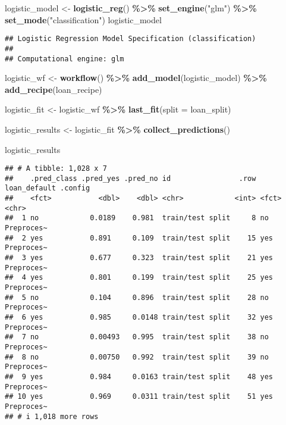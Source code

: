 \documentclass[
]{article}
\newenvironment{Shaded}{\begin{snugshade}}{\end{snugshade}}
\newcommand{\AttributeTok}[1]{\textcolor[rgb]{0.13,0.29,0.53}{#1}}
\newcommand{\FunctionTok}[1]{\textcolor[rgb]{0.13,0.29,0.53}{\textbf{#1}}}
\newcommand{\NormalTok}[1]{#1}
\newcommand{\OtherTok}[1]{\textcolor[rgb]{0.56,0.35,0.01}{#1}}
\newcommand{\SpecialCharTok}[1]{\textcolor[rgb]{0.81,0.36,0.00}{\textbf{#1}}}
\newcommand{\StringTok}[1]{\textcolor[rgb]{0.31,0.60,0.02}{#1}}
\begin{document}
\begin{Shaded}
\begin{Highlighting}[]
\NormalTok{logistic\_model }\OtherTok{\textless{}{-}} \FunctionTok{logistic\_reg}\NormalTok{() }\SpecialCharTok{\%\textgreater{}\%} 
                  \FunctionTok{set\_engine}\NormalTok{(}\StringTok{"glm"}\NormalTok{) }\SpecialCharTok{\%\textgreater{}\%} 
                  \FunctionTok{set\_mode}\NormalTok{(}\StringTok{"classification"}\NormalTok{)}
\NormalTok{logistic\_model}
\end{Highlighting}
\end{Shaded}

\begin{verbatim}
## Logistic Regression Model Specification (classification)
## 
## Computational engine: glm
\end{verbatim}

\begin{Shaded}
\begin{Highlighting}[]
\NormalTok{logistic\_wf }\OtherTok{\textless{}{-}} \FunctionTok{workflow}\NormalTok{() }\SpecialCharTok{\%\textgreater{}\%} 
               \FunctionTok{add\_model}\NormalTok{(logistic\_model) }\SpecialCharTok{\%\textgreater{}\%} 
               \FunctionTok{add\_recipe}\NormalTok{(loan\_recipe)}

\NormalTok{logistic\_fit }\OtherTok{\textless{}{-}}\NormalTok{   logistic\_wf }\SpecialCharTok{\%\textgreater{}\%} 
                \FunctionTok{last\_fit}\NormalTok{(}\AttributeTok{split =}\NormalTok{ loan\_split)}

\NormalTok{logistic\_results }\OtherTok{\textless{}{-}}\NormalTok{  logistic\_fit }\SpecialCharTok{\%\textgreater{}\%} 
                     \FunctionTok{collect\_predictions}\NormalTok{()}

\NormalTok{logistic\_results}
\end{Highlighting}
\end{Shaded}

\begin{verbatim}
## # A tibble: 1,028 x 7
##    .pred_class .pred_yes .pred_no id                .row loan_default .config   
##    <fct>           <dbl>    <dbl> <chr>            <int> <fct>        <chr>     
##  1 no            0.0189    0.981  train/test split     8 no           Preproces~
##  2 yes           0.891     0.109  train/test split    15 yes          Preproces~
##  3 yes           0.677     0.323  train/test split    21 yes          Preproces~
##  4 yes           0.801     0.199  train/test split    25 yes          Preproces~
##  5 no            0.104     0.896  train/test split    28 no           Preproces~
##  6 yes           0.985     0.0148 train/test split    32 yes          Preproces~
##  7 no            0.00493   0.995  train/test split    38 no           Preproces~
##  8 no            0.00750   0.992  train/test split    39 no           Preproces~
##  9 yes           0.984     0.0163 train/test split    48 yes          Preproces~
## 10 yes           0.969     0.0311 train/test split    51 yes          Preproces~
## # i 1,018 more rows
\end{verbatim}
\end{document}
